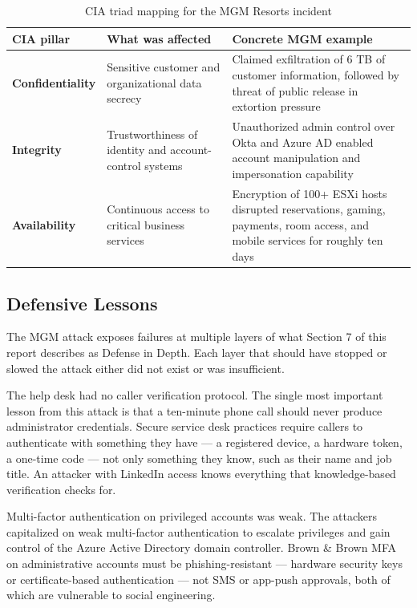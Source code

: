 \begin{table}[htbp]
\centering
\small
\setlength{\tabcolsep}{5pt}
\begin{tabularx}{\textwidth}{>{\bfseries}p{2.8cm} X X}
\toprule
CIA pillar & What was affected & Concrete MGM example \\
\midrule
Confidentiality & Sensitive customer and organizational data secrecy & Claimed exfiltration of 6 TB of customer information, followed by threat of public release in extortion pressure \\

Integrity & Trustworthiness of identity and account-control systems & Unauthorized admin control over Okta and Azure AD enabled account manipulation and impersonation capability \\

Availability & Continuous access to critical business services & Encryption of 100+ ESXi hosts disrupted reservations, gaming, payments, room access, and mobile services for roughly ten days \\
\bottomrule
\end{tabularx}
\caption{CIA triad mapping for the MGM Resorts incident}
\label{tab:mgm-cia-triad-mapping}
\end{table}



\subsection{Defensive Lessons}

The MGM attack exposes failures at multiple layers of what Section 7 of this report describes as Defense in Depth. Each layer that should have stopped or slowed the attack either did not exist or was insufficient.

The help desk had no caller verification protocol. The single most important lesson from this attack is that a ten-minute phone call should never produce administrator credentials. Secure service desk practices require callers to authenticate with something they have — a registered device, a hardware token, a one-time code — not only something they know, such as their name and job title. An attacker with LinkedIn access knows everything that knowledge-based verification checks for.

Multi-factor authentication on privileged accounts was weak. The attackers capitalized on weak multi-factor authentication to escalate privileges and gain control of the Azure Active Directory domain controller. Brown \& Brown MFA on administrative accounts must be phishing-resistant — hardware security keys or certificate-based authentication — not SMS or app-push approvals, both of which are vulnerable to social engineering.

